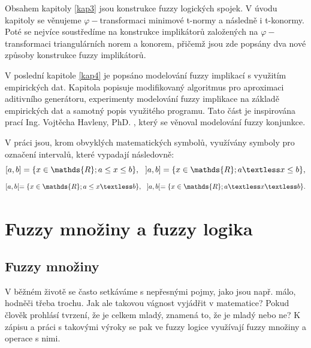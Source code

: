 Obsahem kapitoly \ref{kap3} jsou  konstrukce fuzzy logických spojek. V úvodu  kapitoly se věnujeme $\varphi-$transformaci minimové t-normy a následně i t-konormy. Poté se nejvíce soustředíme na konstrukce implikátorů založených na $\varphi-$transformaci triangulárních norem a konorem, přičemž jsou zde  popsány dva nové způsoby  konstrukce fuzzy implikátor\r u. 

 V poslední kapitole \ref{kap4} je popsáno modelování fuzzy implikací s využitím empirických dat. Kapitola popisuje modifikovaný algoritmus pro aproximaci aditivního generátoru, experimenty modelování fuzzy implikace na základě empirických dat a samotný popis využitého programu. Tato část je inspirována prací Ing. Vojtěcha Havleny, PhD. \cite{havlena}, který se věnoval modelování fuzzy konjunkce. 

 V práci jsou, krom obvyklých matematických symbol\r u, využívány symboly pro označení interval\r u, které vypadají následovně:
 $$[a,b] = \{x \in \mathds{R}; a \leq x \leq b \}, ~~]a,b] = \{x \in \mathds{R}; a \textless x \leq b \},$$
   $$[a,b[ = \{x \in \mathds{R}; a \leq x \textless b \}, ~~]a,b[ = \{x \in \mathds{R}; a \textless x \textless b \}.$$




\chapter {Fuzzy mno\v ziny a fuzzy logika}
\label{kap2}
\section{Fuzzy mno\v ziny} 


V běžném životě se často setkáváme s nepřesnými pojmy, jako jsou např. \clqq málo\crqq, \clqq hodně\crqq \space či třeba \clqq trochu\crqq. Jak ale takovou vágnost vyjádřit v matematice? Pokud člověk prohlásí tvrzení, že je \clqq celkem mladý\crqq, znamená to, že je mladý nebo ne? K zápisu a práci s takovými výroky se pak ve fuzzy logice využívají fuzzy množiny a operace s nimi.

